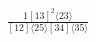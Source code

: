 \documentclass[varwidth, border=5pt]{standalone}
\begin{document}
\begin{my}
$\begin{gathered}
\scriptscriptstyle\frac{1[13]^2⟨23⟩}{[12]⟨25⟩[34]⟨35⟩}
\end{gathered}$
\end{my}
\end{document}
